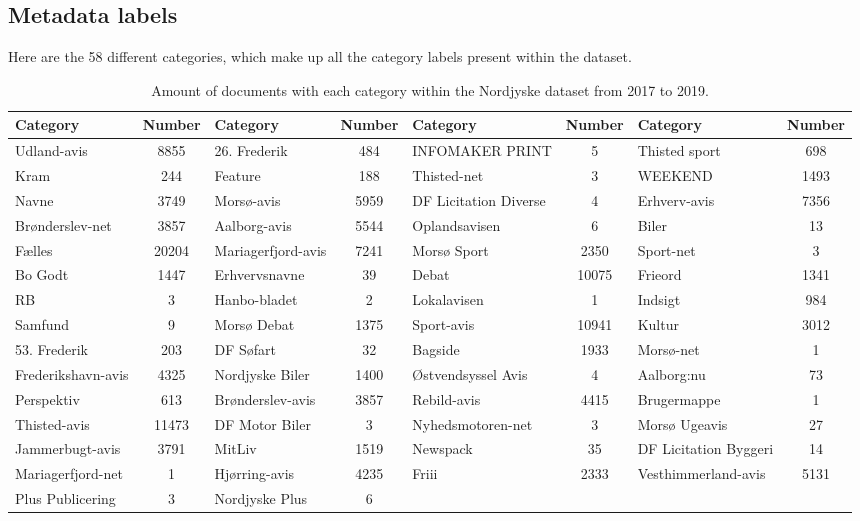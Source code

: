 \subsection{Metadata labels}\label{sec:appendix_meta_data}
Here are the 58 different categories, which make up all the category labels present within the dataset.


\begin{table*}[h]
	\centering
	\begin{tabular}{l|c|l|c|l|c|l|c}
		Category & Number & Category & Number & Category & Number & Category & Number \\
 		\toprule
		Udland-avis & 8855 & 26. Frederik & 484 & INFOMAKER PRINT & 5 & Thisted sport & 698\\
		Kram & 244 & Feature & 188 & Thisted-net & 3 & WEEKEND & 1493\\
		Navne & 3749 & Morsø-avis & 5959 & DF Licitation Diverse & 4 & Erhverv-avis & 7356\\
		Brønderslev-net & 3857 & Aalborg-avis & 5544 & Oplandsavisen & 6 & Biler & 13\\
		Fælles & 20204 & Mariagerfjord-avis & 7241 & Morsø Sport & 2350 & Sport-net & 3\\
		Bo Godt & 1447 & Erhvervsnavne & 39 & Debat & 10075 & Frieord & 1341\\
		RB & 3 & Hanbo-bladet & 2 & Lokalavisen & 1 & Indsigt & 984\\
		Samfund & 9 & Morsø Debat & 1375 & Sport-avis & 10941 & Kultur & 3012 \\
		53. Frederik & 203 & DF Søfart & 32 & Bagside & 1933 & Morsø-net & 1 \\
		Frederikshavn-avis & 4325 & Nordjyske Biler & 1400 & Østvendsyssel Avis & 4 & Aalborg:nu & 73\\
		Perspektiv & 613 & Brønderslev-avis & 3857 & Rebild-avis & 4415 & Brugermappe & 1\\
		Thisted-avis & 11473 & DF Motor Biler & 3 & Nyhedsmotoren-net & 3 & Morsø Ugeavis & 27\\
		Jammerbugt-avis & 3791 & MitLiv & 1519 & Newspack & 35 & DF Licitation Byggeri & 14\\
		Mariagerfjord-net & 1 & Hjørring-avis & 4235 & Friii & 2333 & Vesthimmerland-avis & 5131\\
		Plus Publicering & 3 & Nordjyske Plus & 6 & & & & \\
		\bottomrule
	\end{tabular}
	\caption{Amount of documents with each category within the Nordjyske dataset from 2017 to 2019.}
	\label{tab:category_table}
\end{table*}
